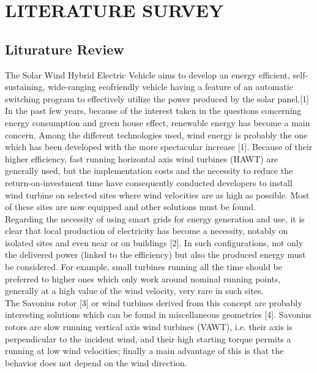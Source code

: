 \documentclass[a4paper,12pt]{article}
\begin{document}
\newpage
\section{LITERATURE SURVEY}

\subsection{Liturature Review}


The Solar Wind Hybrid Electric Vehicle aims to
develop an energy efficient, self-sustaining,
wide-ranging ecofriendly vehicle having a
feature of an automatic switching program to
effectively utilize the power produced by the
solar panel.[1]\\

In the past few years, because of the interest taken in the questions concerning energy consumption and green house effect, renewable energy has become a main concern. Among the different technologies used, wind energy is probably the one which has been developed with the more spectacular increase [1]. Because of their higher efficiency, fast running horizontal axis wind turbines (HAWT) are generally used, but the implementation costs and the necessity to reduce the return-on-investment time have consequently conducted developers to install wind turbine on selected sites where wind velocities are as high as possible. Most of these sites are now equipped and other solutions must be found.\\

Regarding the necessity of using smart grids for energy generation and use, it is clear that local production of electricity has become a necessity, notably on isolated sites and even near or on buildings [2]. In such configurations, not only the delivered power (linked to the efficiency) but also the produced energy must be considered. For example, small turbines running all the time should be preferred to higher ones which only work around nominal running points, generally at a high value of the wind velocity, very rare in such sites.\\

The Savonius rotor [3] or wind turbines derived from this concept are probably interesting solutions which can be found in miscellaneous geometries [4]. Savonius rotors are slow running vertical axis wind turbines (VAWT), i.e. their axis is perpendicular to the incident wind, and their high starting torque permits a running at low wind velocities; finally a main advantage of this is that the behavior does not depend on the wind direction.\\
\end{document}
